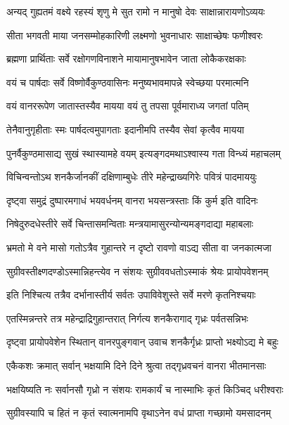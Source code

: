 \twolineshloka
{अन्यद् गुह्यतमं वक्ष्ये रहस्यं शृणु मे सुत}
{रामो न मानुषो देवः साक्षान्नारायणोऽव्ययः} %

\twolineshloka
{सीता भगवती माया जनसम्मोहकारिणी}
{लक्ष्मणो भुवनाधारः साक्षाच्छेषः फणीश्वरः} %

\twolineshloka
{ब्रह्मणा प्रार्थिताः सर्वे रक्षोगणविनाशने}
{मायामानुषभावेन जाता लोकैकरक्षकाः} %

\twolineshloka
{वयं च पार्षदाः सर्वे विष्णोर्वैकुण्ठवासिनः}
{मनुष्यभावमापन्ने स्वेच्छया परमात्मनि} %

\twolineshloka
{वयं वानररूपेण जातास्तस्यैव मायया}
{वयं तु तपसा पूर्वमाराध्य जगतां पतिम्} %

\twolineshloka
{तेनैवानुगृहीताः स्मः पार्षदत्वमुपागताः}
{इदानीमपि तस्यैव सेवां कृत्वैव मायया} %

\twolineshloka
{पुनर्वैकुण्ठमासाद्य सुखं स्थास्यामहे वयम्}
{इत्यङ्गदमथाऽश्वास्य गता विन्ध्यं महाचलम्} %

\twolineshloka
{विचिन्वन्तोऽथ शनकैर्जानकीं दक्षिणाम्बुधेः}
{तीरे महेन्द्राख्यगिरेः पवित्रं पादमाययुः} %

\twolineshloka
{दृष्ट्वा समुद्रं दुष्पारमगाधं भयवर्धनम्}
{वानरा भयसन्त्रस्ताः किं कुर्म इति वादिनः} %

\twolineshloka
{निषेदुरुदधेस्तीरे सर्वे चिन्तासमन्विताः}
{मन्त्रयामासुरन्योन्यमङ्गदाद्या महाबलाः} %

\twolineshloka
{भ्रमतो मे वने मासो गतोऽत्रैव गुहान्तरे}
{न दृष्टो रावणो वाऽद्य सीता वा जनकात्मजा} %

\twolineshloka
{सुग्रीवस्तीक्ष्णदण्डोऽस्मान्निहन्त्येव न संशयः}
{सुग्रीववधतोऽस्माकं श्रेयः प्रायोपवेशनम्} %

\twolineshloka
{इति निश्चित्य तत्रैव दर्भानास्तीर्य सर्वतः}
{उपाविवेशुस्ते सर्वे मरणे कृतनिश्चयाः} %

\twolineshloka
{एतस्मिन्नन्तरे तत्र महेन्द्राद्रिगुहान्तरात्}
{निर्गत्य शनकैरागाद् गृध्रः पर्वतसन्निभः} %

\twolineshloka
{दृष्ट्वा प्रायोपवेशेन स्थितान् वानरपुङ्गवान्}
{उवाच शनकैर्गृध्रः प्राप्तो भक्ष्योऽद्य मे बहुः} %

\twolineshloka
{एकैकशः क्रमात् सर्वान् भक्षयामि दिने दिने}
{श्रुत्वा तद्गृध्रवचनं वानरा भीतमानसाः} %

\twolineshloka
{भक्षयिष्यति नः सर्वानसौ गृध्रो न संशयः}
{रामकार्यं च नास्माभिः कृतं किञ्चिद् धरीश्वराः} %

\twolineshloka
{सुग्रीवस्यापि च हितं न कृतं स्वात्मनामपि}
{वृथाऽनेन वधं प्राप्ता गच्छामो यमसादनम्} %

